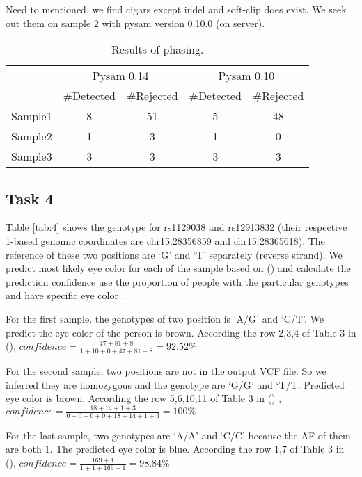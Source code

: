 \documentclass[a4paper]{article}
\begin{document}
Need to mentioned, we find cigars except indel and soft-clip does exist. We seek out them on sample 2 with pysam version 0.10.0 (on server).

\begin{table}[H]
	\centering
	\begin{tabular}{c|cc|cc}
		\hline
		& \multicolumn{2}{c|}{Pysam 0.14}  &  \multicolumn{2}{c}{Pysam 0.10}   \\
		& $\#$Detected & $\#$Rejected & $\#$Detected & $\#$Rejected \\	 
		\hline
		Sample1 & 8  & 51 & 5 & 48 \\
		\hline
		Sample2 & 1 & 3 & 1 & 0  \\
		\hline
		Sample3 & 3 & 3 & 3 & 3  \\
		\hline
	\end{tabular}
	\caption{\label{tab:3}Results of phasing.}
\end{table}



\subsection{Task 4}

Table \ref{tab:4} shows the genotype for rs1129038 and rs12913832 (their respective 1-based genomic coordinates are chr15:28356859 and chr15:28365618). The reference of these two positions are `G' and `T' separately (reverse strand). We predict most likely eye color for each of the sample  based on (\cite{Sturm2008A}) and calculate the prediction confidence use the proportion of people with the particular genotypes and have specific eye color .

For the first sample. the genotypes of two position is `A/G' and `C/T'. We predict the eye color of the person is brown. According the row 2,3,4 of Table 3 in (\cite{Sturm2008A}), $confidence =\frac{47+81+8}{1+10+0+47+81+8}=92.52\%$

For the second sample, two positions are not in the output VCF file. So we inferred they are homozygous and the genotype are `G/G' and `T/T. Predicted eye color is brown. According the row 5,6,10,11 of Table 3 in (\cite{Sturm2008A}) , $confidence =\frac{18+14+1+3}{0+0+0+0+18+14+1+3}=100\%$

For the last sample, two genotypes are `A/A' and `C/C' because the AF of them are both 1. The predicted eye color is blue. According the row 1,7 of Table 3 in (\cite{Sturm2008A}), $confidence =\frac{169+1}{1+1+169+1}=98.84\%$
\end{document}

